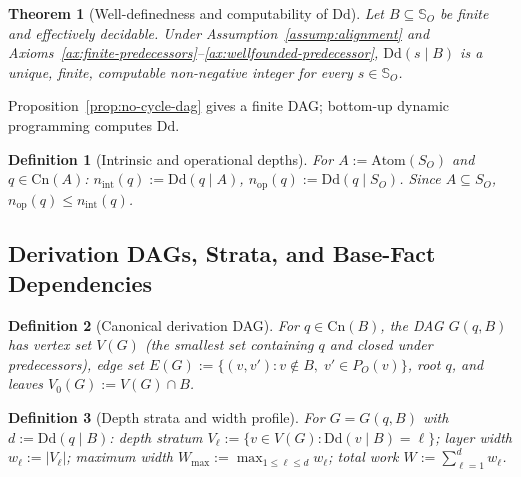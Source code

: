 \documentclass[journal]{IEEEtran}
\makeatletter
\newcommand{\Dd}{\text{Dd}}
\newcommand{\Atom}{\text{Atom}}
\newcommand{\Cn}{\text{Cn}}
\newtheorem{theorem}{Theorem}[section]
\newtheorem{definition}{Definition}[section]
\numberwithin{equation}{section}
\renewenvironment{proof}[1][\proofname]{\par
  \pushQED{\qed}%
  \normalfont \topsep6\p@\@plus6\p@\relax
  \trivlist
  \item[\hskip\labelsep
        \itshape
    #1\@addpunct{.}]\ignorespaces
}{%
  \popQED\endtrivlist\@endpefalse
}
\makeatother
\begin{document}
\begin{theorem}[Well-definedness and computability of $\Dd$]
\label{thm:computability-Dd}
Let $B\subseteq\mathbb S_O$ be finite and effectively decidable.
Under Assumption~\ref{assump:alignment} and
Axioms~\ref{ax:finite-predecessors}--\ref{ax:wellfounded-predecessor},
$\Dd(s\mid B)$ is a unique, finite, computable non-negative
integer for every $s\in\mathbb S_O$.
\end{theorem}

\begin{proof}
Proposition~\ref{prop:no-cycle-dag} gives a finite DAG;
bottom-up dynamic programming computes $\Dd$.
\end{proof}

\begin{definition}[Intrinsic and operational depths]
\label{def:int-op-depth}
For $A:=\Atom(S_O)$ and $q\in\Cn(A)$:
$n_{\mathrm{int}}(q):=\Dd(q\mid A)$,
$n_{\mathrm{op}}(q):=\Dd(q\mid S_O)$.
Since $A\subseteq S_O$, $n_{\mathrm{op}}(q)\le n_{\mathrm{int}}(q)$.
\end{definition}

\subsection{Derivation DAGs, Strata, and Base-Fact Dependencies}
\label{subsec:dag-strata}

\begin{definition}[Canonical derivation DAG]
\label{def:canonical-dag}
For $q\in\Cn(B)$, the DAG $G(q,B)$ has vertex set $V(G)$
(the smallest set containing $q$ and closed under
predecessors), edge set
$E(G):=\{(v,v'):v\notin B,\;v'\in P_O(v)\}$,
root $q$, and leaves $V_0(G):=V(G)\cap B$.
\end{definition}

\begin{definition}[Depth strata and width profile]
\label{def:strata}
For $G=G(q,B)$ with $d:=\Dd(q\mid B)$:
depth stratum
$V_\ell:=\{v\in V(G):\Dd(v\mid B)=\ell\}$;
layer width $w_\ell:=|V_\ell|$;
maximum width $W_{\max}:=\max_{1\le\ell\le d}w_\ell$;
total work $W:=\sum_{\ell=1}^{d}w_\ell$.
\end{definition}
\end{document}
